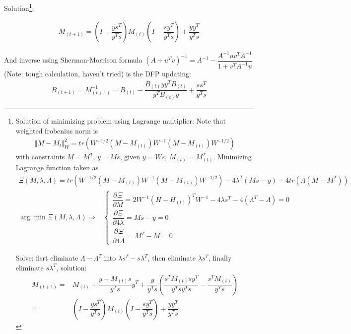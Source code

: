 \begin{itemize}[topsep=2pt,itemsep=0pt]
    Solution\footnote{Solution of minimizing problem using Lagrange multiplier: Note that weighted frobenius norm is 
\begin{align}
    \Vert M-M_{t} \Vert_W^2=tr\left(W^{-1/2}(M-M_{(t)})W^{-1}(M-M_{(t)})W^{-1/2}\right)  
\end{align}
    with constraints $ M=M^T $, $ y=Ms $, given $ y=Ws $, $ M_{(t)}=M_{(t)}^T $. Minimizing Lagrange function taken as 
\begin{align}
    \Xi(M,\lambda ,\Lambda )= tr\left(W^{-1/2}(M-M_{(t)})W^{-1}(M-M_{(t)})W^{-1/2}\right)-4\lambda ^T(Ms-y)-4tr\left(\Lambda (M-M^T)\right) 
\end{align}
\begin{align}
    \arg\min \Xi(M,\lambda ,\Lambda )\Rightarrow &\begin{cases}
        \dfrac{\partial^{} \Xi}{\partial M}=2W^{-1}(H-H_{(t)})^TW^{-1}-4\lambda s^T-4(\Lambda^T -\Lambda )=0\\
        \dfrac{\partial^{} \Xi}{\partial 4\lambda ^{}}=Ms-y=0\\
        \dfrac{\partial^{} \Xi}{\partial 4\Lambda ^{}}=M^T-M=0
    \end{cases}
\end{align}
    
Solve: fisrt eliminate $ \Lambda -\Lambda ^T $ into $\lambda s^T-s\lambda ^T $, then eliminate $ \lambda s^T $, finally eliminate $ s\lambda ^T $, solution:
\begin{align}
    M_{(t+1)}=&M_{(t)}+\dfrac{y-M_{(t)}s}{y^Ts}y^T+\dfrac{y}{y^Ts}\left( \dfrac{s^TM_{(t)}sy^T}{y^Tsy^Ts}-\dfrac{s^TM_{(t)}}{y^Ts} \right)\\
    =&\left(I-\dfrac{ys^T}{y^Ts}\right)M_{(t)}\left(I-\dfrac{sy^T}{y^Ts}\right)+\dfrac{yy^T}{y^Ts}
\end{align}}:

    \begin{align}
        M_{(t+1)}=\left(I-\dfrac{ys^T}{y^Ts}\right)M_{(t)}\left(I-\dfrac{sy^T}{y^Ts}\right)+\dfrac{yy^T}{y^Ts} 
    \end{align}
    
    
   

    And inverse using Sherman-Morrison formula $ \left(A+u^Tv\right)^{-1}=A^{-1}-\dfrac{A^{-1}uv^TA^{-1}}{1+v^TA^{-1}u}  $ (Note: tough calculation, haven't tried) is the DFP updating:
        \begin{align}
            B_{(t+1)}=M_{(t+1)}^{-1}=B_{(t)}-\dfrac{B_{(t)}yy^TB_{(t)}}{y^TB_{(t)}y}+\dfrac{ss^T}{y^Ts}   \tag{DFP}
        \end{align}
    

\end{itemize}

